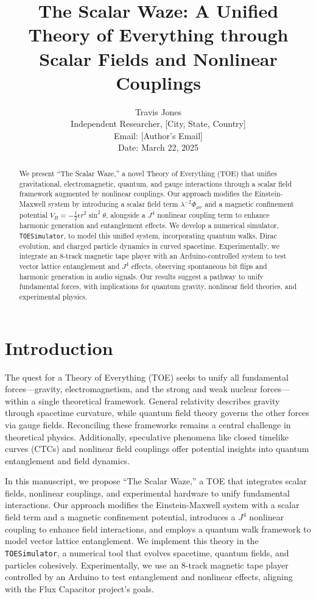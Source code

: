 \documentclass[12pt]{article}
\title{The Scalar Waze: A Unified Theory of Everything through Scalar Fields and Nonlinear Couplings}
\author{Travis Jones \\ 
        Independent Researcher, [City, State, Country] \\ 
        Email: [Author's Email] \\ 
        Date: March 22, 2025}
\date{}
\begin{document}
\maketitle

\begin{abstract}
We present ``The Scalar Waze,'' a novel Theory of Everything (TOE) that unifies gravitational, electromagnetic, quantum, and gauge interactions through a scalar field framework augmented by nonlinear couplings. Our approach modifies the Einstein-Maxwell system by introducing a scalar field term \( \lambda^{-2} \Phi_{\mu \nu} \) and a magnetic confinement potential \( V_B = -\frac{1}{2} \epsilon r^2 \sin^2 \theta \), alongside a \( J^4 \) nonlinear coupling term to enhance harmonic generation and entanglement effects. We develop a numerical simulator, \texttt{TOESimulator}, to model this unified system, incorporating quantum walks, Dirac evolution, and charged particle dynamics in curved spacetime. Experimentally, we integrate an 8-track magnetic tape player with an Arduino-controlled system to test vector lattice entanglement and \( J^4 \) effects, observing spontaneous bit flips and harmonic generation in audio signals. Our results suggest a pathway to unify fundamental forces, with implications for quantum gravity, nonlinear field theories, and experimental physics.
\end{abstract}

\section{Introduction}

The quest for a Theory of Everything (TOE) seeks to unify all fundamental forces—gravity, electromagnetism, and the strong and weak nuclear forces—within a single theoretical framework. General relativity describes gravity through spacetime curvature, while quantum field theory governs the other forces via gauge fields. Reconciling these frameworks remains a central challenge in theoretical physics. Additionally, speculative phenomena like closed timelike curves (CTCs) and nonlinear field couplings offer potential insights into quantum entanglement and field dynamics.

In this manuscript, we propose ``The Scalar Waze,'' a TOE that integrates scalar fields, nonlinear couplings, and experimental hardware to unify fundamental interactions. Our approach modifies the Einstein-Maxwell system with a scalar field term and a magnetic confinement potential, introduces a \( J^4 \) nonlinear coupling to enhance field interactions, and employs a quantum walk framework to model vector lattice entanglement. We implement this theory in the \texttt{TOESimulator}, a numerical tool that evolves spacetime, quantum fields, and particles cohesively. Experimentally, we use an 8-track magnetic tape player controlled by an Arduino to test entanglement and nonlinear effects, aligning with the Flux Capacitor project's goals.
\end{document}
